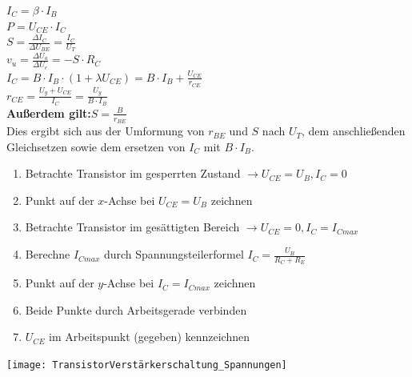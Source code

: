 \documentclass[a5paper, 12pt, twoside]{scrartcl}
\begin{document}
\dotfill\(\displaystyle I_C = \beta \cdot I_B\)\\[1em]
\dotfill\(\displaystyle P = U_{CE} \cdot I_C\)\\[1em]
\dotfill\(\displaystyle S = \frac{\Delta I_C}{\Delta U_{BE}} = \frac{I_C}{U_T}\)\\[1em]
\dotfill\(\displaystyle v_u = \frac{\Delta U_a}{\Delta U_e} = -S \cdot R_C\)\\[1em]
\dotfill\(\displaystyle I_C = B \cdot I_B \cdot (1 + \lambda U_{CE}) = B \cdot I_B + \frac{U_{CE}}{r_{CE}}\)\\[1em]
\dotfill\(\displaystyle r_{CE} = \frac{U_y + U_{CE}}{I_C} = \frac{U_y}{B \cdot I_B}\)\\[1em]
\textbf{\textcolor{myblue}{Außerdem gilt:\dotfill\(\displaystyle S = \frac{B}{r_{BE}}\)}}\\[1em]
\textcolor{myblue}{Dies ergibt sich aus der Umformung von \(r_{BE}\) und \(S\) nach \(U_T\), dem anschließenden Gleichsetzen sowie dem ersetzen von \(I_C\) mit \(B \cdot I_B\).}

\vspace{.5cm}

\begin{enumerate}
\item Betrachte Transistor im gesperrten Zustand \(\rightarrow U_{CE} = U_B, I_C = 0\)
\item Punkt auf der \(x\)-Achse bei \(U_{CE} = U_B\) zeichnen
\item Betrachte Transistor im gesättigten Bereich \(\rightarrow U_{CE} = 0, I_C = I_{Cmax}\)
\item Berechne \(I_{Cmax}\) durch Spannungsteilerformel \(I_C = \frac{U_B}{R_C + R_E}\)
\item Punkt auf der \(y\)-Achse bei \(I_C = I_{Cmax}\) zeichnen
\item Beide Punkte durch Arbeitsgerade verbinden
\item \(U_{CE}\) im Arbeitspunkt (gegeben) kennzeichnen
\end{enumerate}

\clearpage

{\centering
  \texttt{[image: TransistorVerstärkerschaltung\_Spannungen]}
  \par%
}

\end{document}
